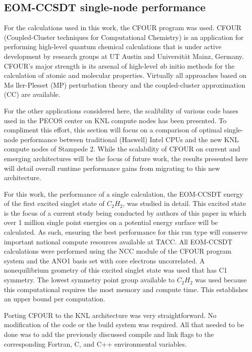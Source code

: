 \subsection{EOM-CCSDT single-node performance}
\label{sec:cfour}

For the calculations used in this work,
the CFOUR \cite{cfour:08} program was used. CFOUR
(Coupled-Cluster techniques for Computational Chemistry) is an
application for performing high-level quantum chemical calculations
that is under active development by research groups at UT Austin and
Universit\"{a}t Mainz, Germany. CFOUR's major strength is its arsenal
of high-level {\emph ab initio} methods for the calculation of atomic and
molecular properties.  Virtually all approaches based on M\o
ller-Plesset (MP) perturbation theory and the coupled-cluster
approximation (CC) are available.

For the other applications considered here, the scalibility of various code bases 
used in the PECOS center on KNL compute nodes has been presented. To compliment
this effort, this section will focus on a comparison of optimal single-node performance
between traditional (Haswell) Intel CPUs and the new KNL compute nodes of Stampede 2.
While the scalability of CFOUR on current and emerging architectures will be the focus 
of future work, the results presented here will detail overall runtime performance gains
from migrating to this new architecture. 

For this work, the performance of a single calculation, the EOM-CCSDT energy of the first
excited singlet state of $C_2H_2$, was studied in detail. This excited state is the focus
of a current study being conducted by authors of this paper in which over 1 million single point
energies on a potential energy surface will be calculated. As such, ensuring the best performance for this run 
type will conserve important national compute resources available at TACC. All EOM-CCSDT calculations were performed 
using the NCC module \cite{ncc:15} of the CFOUR program system and the ANO1 basis set \cite{ano1:87} with core 
electrons uncorrelated. A nonequilibrium geometry of this excited singlet state was used that has C1 symmetry. 
The lowest symmetry point group available to $C_2H_2$ was used because this computational requires the most memory 
and compute time. This establishes an upper bound per computation.

Porting CFOUR to the KNL architecture was very straightforward. No modification of the code or the build
system was required. All that needed to be done was to add the previously discussed compile and link flags
to the corresponding Fortran, C, and C++ environmental variables.

